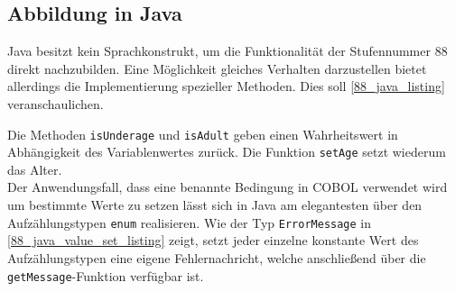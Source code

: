 
\subsection*{Abbildung in Java}
Java besitzt kein Sprachkonstrukt, um die Funktionalität der Stufennummer 88 direkt nachzubilden. Eine Möglichkeit gleiches Verhalten darzustellen bietet allerdings die Implementierung spezieller Methoden. Dies soll \autoref{88_java_listing} veranschaulichen.\\


Die Methoden \texttt{isUnderage} und \texttt{isAdult} geben einen Wahrheitswert in Abhängigkeit des Variablenwertes zurück. Die Funktion \texttt{setAge} setzt wiederum das Alter.\\

Der Anwendungsfall, dass eine benannte Bedingung in COBOL verwendet wird um bestimmte Werte zu setzen lässt sich in Java am elegantesten über den Aufzählungstypen \texttt{enum} realisieren. Wie der Typ \texttt{ErrorMessage} in \autoref{88_java_value_set_listing} zeigt, setzt jeder einzelne konstante Wert des Aufzählungstypen eine eigene Fehlernachricht, welche anschließend über die \texttt{getMessage}-Funktion verfügbar ist.\\

